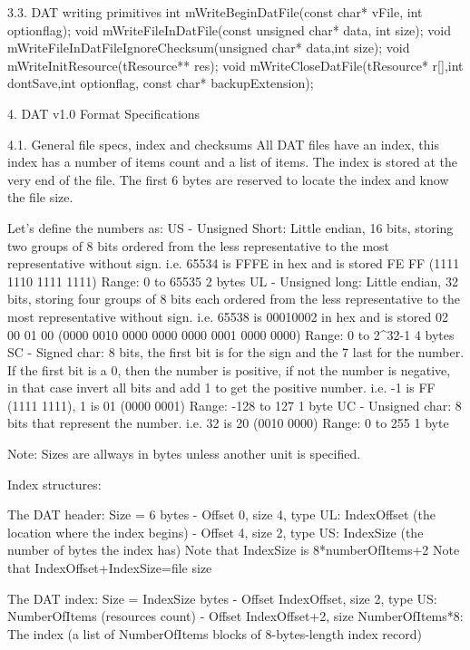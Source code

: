 3.3. DAT writing primitives
 int  mWriteBeginDatFile(const char* vFile, int optionflag);
 void mWriteFileInDatFile(const unsigned char* data, int size);
 void mWriteFileInDatFileIgnoreChecksum(unsigned char* data,int size);
 void mWriteInitResource(tResource** res);
 void mWriteCloseDatFile(tResource* r[],int dontSave,int optionflag, const
      char* backupExtension);


4. DAT v1.0 Format Specifications
   ~~~ ~~~~ ~~~~~~ ~~~~~~~~~~~~~~

4.1. General file specs, index and checksums
 All DAT files have an index, this index has a number of items count and
 a list of items.
 The index is stored at the very end of the file.
 The first 6 bytes are reserved to locate the index and know the file size.

 Let's define the numbers as:
  US - Unsigned Short: Little endian, 16 bits, storing two groups of 8 bits
       ordered from the less representative to the most representative
       without sign.
       i.e. 65534 is FFFE in hex and is stored FE FF (1111 1110  1111 1111)
       Range: 0 to 65535
       2 bytes
  UL - Unsigned long: Little endian, 32 bits, storing four groups of 8 bits
       each ordered from the less representative to the most representative
       without sign.
       i.e. 65538 is 00010002 in hex and is stored 02 00 01 00
       (0000 0010  0000 0000  0000 0001  0000 0000)
       Range: 0 to 2^32-1
       4 bytes
  SC - Signed char: 8 bits, the first bit is for the sign and the 7 last
       for the number. If the first bit is a 0, then the number is
       positive, if not the number is negative, in that case invert all
       bits and add 1 to get the positive number.
       i.e. -1 is FF (1111 1111), 1 is 01 (0000 0001)
       Range: -128 to 127
       1 byte
  UC - Unsigned char: 8 bits that represent the number.
       i.e. 32 is 20 (0010 0000)
       Range: 0 to 255
       1 byte

 Note: Sizes are allways in bytes unless another unit is specified.

 Index structures:

 The DAT header: Size = 6 bytes
  - Offset 0, size 4, type UL: IndexOffset
           (the location where the index begins)
  - Offset 4, size 2, type US: IndexSize
           (the number of bytes the index has)
           Note that IndexSize is 8*numberOfItems+2
           Note that IndexOffset+IndexSize=file size

 The DAT index: Size = IndexSize bytes
  - Offset IndexOffset,   size 2, type US: NumberOfItems
           (resources count)
  - Offset IndexOffset+2, size NumberOfItems*8: The index
           (a list of NumberOfItems blocks of 8-bytes-length index record)

